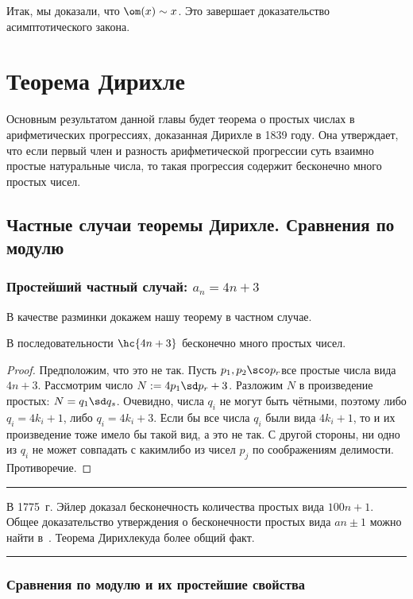 \documentclass[a4paper]{article}
\newenvironment{petit}
{\par\smallskip\hrule\smallskip\footnotesize}{\par\smallskip\hrule\smallskip}
\begin{document}
Итак, мы доказали, что $\om(x) \sim x$. Это завершает доказательство асимптотического закона.

\section{Теорема Дирихле}

Основным результатом данной главы будет теорема о простых числах в арифметических прогрессиях,
доказанная Дирихле в 1839 году. Она утверждает, что если первый член и разность арифметической
прогрессии суть взаимно простые натуральные числа, то такая прогрессия содержит бесконечно много простых чисел.

\subsection{Частные случаи теоремы Дирихле. Сравнения по модулю}

\subsubsection{Простейший частный случай: $a_n = 4n+3$}

В качестве разминки докажем нашу теорему в частном случае.

\begin{stm}
В последовательности $\hc{4n+3}$ бесконечно много простых чисел.
\end{stm}
\begin{proof}
Предположим, что это не так. Пусть $p_1,p_2\sco p_r$\т  все простые числа вида $4n+3$. Рассмотрим число
$N:=4p_1\sd p_r+3$. Разложим $N$ в произведение простых: $N=q_1\sd q_s$. Очевидно, числа $q_i$
не могут быть чётными, поэтому либо $q_i=4k_i+1$, либо $q_i=4k_i+3$. Если бы все числа $q_i$ были вида
$4k_i+1$, то и их произведение тоже имело бы такой вид, а это не так. С другой стороны, ни одно из $q_i$
не может совпадать с каким\д либо из чисел $p_j$ по соображениям делимости. Противоречие.
\end{proof}

\begin{petit}
В 1775~г. Эйлер доказал бесконечность количества простых вида $100n+1$. Общее доказательство утверждения о
бесконечности простых вида $an\pm 1$ можно найти в~\cite{hass}. Теорема Дирихле\т куда более общий факт.
\end{petit}

\subsubsection{Сравнения по модулю и их простейшие свойства}
\end{document}

